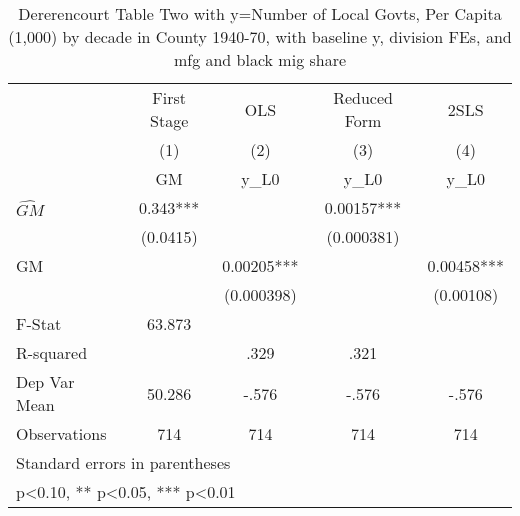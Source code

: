 \begin{table}[htbp]\centering
\def\sym#1{\ifmmode^{#1}\else\(^{#1}\)\fi}
\caption{Dererencourt Table Two with y=Number of Local Govts, Per Capita (1,000) by decade in County 1940-70, with baseline y, division FEs, and mfg and black mig share}
\begin{tabular}{l*{4}{c}}
\toprule
                    & First Stage   &         OLS   &Reduced Form   &        2SLS   \\
                    &\multicolumn{1}{c}{(1)}&\multicolumn{1}{c}{(2)}&\multicolumn{1}{c}{(3)}&\multicolumn{1}{c}{(4)}\\
                    &\multicolumn{1}{c}{GM}&\multicolumn{1}{c}{y\_L0}&\multicolumn{1}{c}{y\_L0}&\multicolumn{1}{c}{y\_L0}\\
\midrule
$\hat{GM}$          &       0.343***&               &     0.00157***&               \\
                    &    (0.0415)   &               &  (0.000381)   &               \\
\addlinespace
GM                  &               &     0.00205***&               &     0.00458***\\
                    &               &  (0.000398)   &               &   (0.00108)   \\
\midrule
F-Stat              &      63.873   &               &               &               \\
R-squared           &               &        .329   &        .321   &               \\
Dep Var Mean        &      50.286   &       -.576   &       -.576   &       -.576   \\
Observations        &         714   &         714   &         714   &         714   \\
\bottomrule
\multicolumn{5}{l}{\footnotesize Standard errors in parentheses}\\
\multicolumn{5}{l}{\footnotesize * p<0.10, ** p<0.05, *** p<0.01}\\
\end{tabular}
\end{table}
